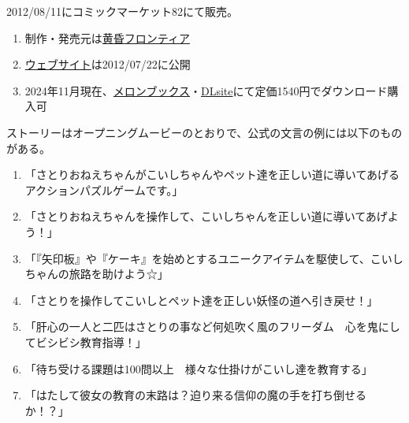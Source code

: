 

%




2012/08/11にコミックマーケット82にて販売。
\begin{enumerate}[label={\sarrow}]
\item 制作・発売元は\href{http://tasofro.net/}{黄昏フロンティア}
\item \href{http://tasofro.net/satori/}{ウェブサイト}は2012/07/22に公開
\item 2024年11月現在、\href{https://www.melonbooks.co.jp/detail/detail.php?product_id=967172}{メロンブックス}・\href{https://www.dlsite.com/home/work/=/product_id/RJ144848.html}{DLsite}にて定価1540円でダウンロード購入可
\end{enumerate}



ストーリーはオープニングムービーのとおりで、公式の文言の例には以下のものがある。
\begin{enumerate}[label={\sarrow}]
\item 「さとりおねえちゃんがこいしちゃんやペット達を正しい道に導いてあげるアクションパズルゲームです。」
\item 「さとりおねえちゃんを操作して、こいしちゃんを正しい道に導いてあげよう！」
\item 「『矢印板』や『ケーキ』を始めとするユニークアイテムを駆使して、こいしちゃんの旅路を助けよう☆」
\item 「さとりを操作してこいしとペット達を正しい妖怪の道へ引き戻せ！」
\item 「肝心の一人と二匹はさとりの事など何処吹く風のフリーダム　心を鬼にしてビシビシ教育指導！」
\item 「待ち受ける課題は100問以上　様々な仕掛けがこいし達を教育する」
\item 「はたして彼女の教育の末路は？迫り来る信仰の魔の手を打ち倒せるか！？」
\end{enumerate}



